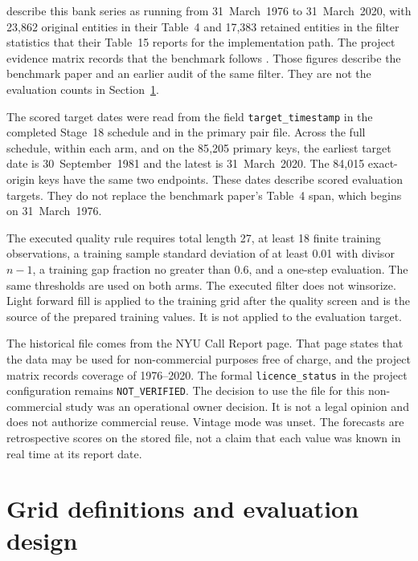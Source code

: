 \documentclass[11pt]{article}
\begin{document}
\citet{bejarano2026ofr} describe this bank series as running from 31~March~1976 to 31~March~2020, with 23{,}862 original entities in their Table~4 and 17{,}383 retained entities in the filter statistics that their Table~15 reports for the implementation path. The project evidence matrix records that the benchmark follows \citet{drechsler2017deposits}. Those figures describe the benchmark paper and an earlier audit of the same filter. They are not the evaluation counts in Section~\ref{sec:design}.

The scored target dates were read from the field \texttt{target\_timestamp} in the completed Stage~18 schedule and in the primary pair file. Across the full schedule, within each arm, and on the 85{,}205 primary keys, the earliest target date is 30~September~1981 and the latest is 31~March~2020. The 84{,}015 exact-origin keys have the same two endpoints. These dates describe scored evaluation targets. They do not replace the benchmark paper's Table~4 span, which begins on 31~March~1976.

The executed quality rule requires total length 27, at least 18 finite training observations, a training sample standard deviation of at least 0.01 with divisor \(n-1\), a training gap fraction no greater than 0.6, and a one-step evaluation. The same thresholds are used on both arms. The executed filter does not winsorize. Light forward fill is applied to the training grid after the quality screen and is the source of the prepared training values. It is not applied to the evaluation target.

The historical file comes from the NYU Call Report page. That page states that the data may be used for non-commercial purposes free of charge, and the project matrix records coverage of 1976--2020. The formal \texttt{licence\_status} in the project configuration remains \texttt{NOT\_VERIFIED}. The decision to use the file for this non-commercial study was an operational owner decision. It is not a legal opinion and does not authorize commercial reuse. Vintage mode was unset. The forecasts are retrospective scores on the stored file, not a claim that each value was known in real time at its report date.

\section{Grid definitions and evaluation design}
\label{sec:design}
\end{document}
